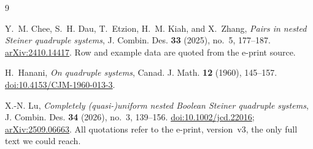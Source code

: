 \documentclass[11pt]{amsart}
\begin{document}
\begin{thebibliography}{9}

Y.~M. Chee, S.~H. Dau, T.~Etzion, H.~M. Kiah, and X.~Zhang,
\emph{Pairs in nested Steiner quadruple systems},
J. Combin. Des. \textbf{33} (2025), no.~5, 177--187.
\href{https://arxiv.org/abs/2410.14417}{arXiv:2410.14417}.
Row and example data are quoted from the e-print source.

H.~Hanani,
\emph{On quadruple systems},
Canad. J. Math. \textbf{12} (1960), 145--157.
\href{https://doi.org/10.4153/CJM-1960-013-3}{doi:10.4153/CJM-1960-013-3}.

X.-N. Lu,
\emph{Completely (quasi-)uniform nested Boolean Steiner quadruple systems},
J. Combin. Des. \textbf{34} (2026), no.~3, 139--156.
\href{https://doi.org/10.1002/jcd.22016}{doi:10.1002/jcd.22016};
\href{https://arxiv.org/abs/2509.06663}{arXiv:2509.06663}.
All quotations refer to the e-print, version~v3, the only full text we could
reach.

\end{thebibliography}
\end{document}
